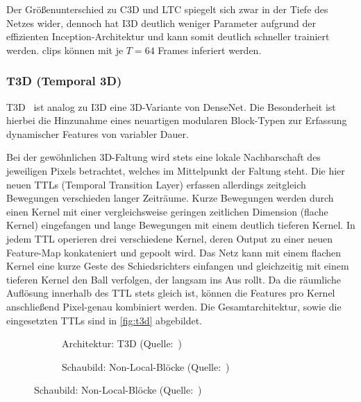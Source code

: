 
Der Größenunterschied zu C3D und LTC spiegelt sich zwar in der Tiefe des Netzes wider, dennoch hat I3D deutlich weniger Parameter aufgrund der effizienten Inception-Architektur und kann somit deutlich schneller trainiert werden.
\glspl{clip} können mit je $T=64$ Frames inferiert werden.

\subsubsection*{T3D (Temporal 3D)}

T3D~\cite{Diba17} ist analog zu I3D eine 3D-Variante von DenseNet.
Die Besonderheit ist hierbei die Hinzunahme eines neuartigen modularen Block-Typen zur Erfassung dynamischer Features von variabler Dauer.

Bei der gewöhnlichen 3D-Faltung wird stets eine lokale Nachbarschaft des jeweiligen Pixels betrachtet, welches im Mittelpunkt der Faltung steht.
Die hier neuen TTLs (Temporal Transition Layer) erfassen allerdings zeitgleich Bewegungen verschieden langer Zeiträume.
Kurze Bewegungen werden durch einen Kernel mit einer vergleichsweise geringen zeitlichen Dimension (flache Kernel) eingefangen und lange Bewegungen mit einem deutlich tieferen Kernel.
In jedem TTL operieren drei verschiedene Kernel, deren Output zu einer neuen Feature-Map konkateniert und gepoolt wird.
Das Netz kann mit einem flachen Kernel \zB eine kurze Geste des Schiedsrichters einfangen und gleichzeitig mit einem tieferen Kernel den Ball verfolgen, der langsam ins Aus rollt.
Da die räumliche Auflösung innerhalb des TTL stets gleich ist, können die Features pro Kernel anschließend Pixel-genau kombiniert werden.
Die Gesamtarchitektur, sowie die eingesetzten TTLs sind in \autoref{fig:t3d} abgebildet.

\begin{figure}
    \centering
    \begin{subfigure}[b]{.5\textwidth}
        \centering
        \caption{Architektur: T3D (Quelle:~\cite{Diba17})}
        \label{fig:t3d}
    \end{subfigure}%
    \begin{subfigure}[b]{.5\textwidth}
        \centering
        \caption{Schaubild: Non-Local-Blöcke (Quelle:~\cite{Wang18})}
        \label{fig:non-local}
    \end{subfigure}
\end{figure}

